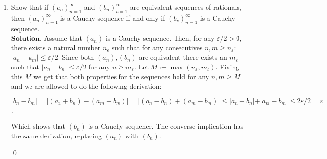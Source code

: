 \documentclass{article}
\theoremstyle{remark}
\begin{document}
\begin{enumerate}
        Let $\varepsilon \leq \min (M, M')$. Then, for some $n_M \geq n_{\varepsilon} \geq 1$, take $n, m \geq n_{\varepsilon}$
        \begin{center}
            $\varepsilon \leq a_n \leq -\varepsilon$
        \end{center}
        But by the inequality given by the fact that $(a_n)$ is a Cauchy sequence we have (adding both inequalities):
        \begin{center}
            $a_m \leq 2a_n \leq a_m$
        \end{center}
        Hence $a_m = 2a_n$, which is then greater than $\varepsilon$.
        Thus:
        \begin{center}
            $\vert a_n - a_m \vert = \vert a_n\vert \geq \varepsilon$.
        \end{center}
        So it shows that $(a_n)$ is not a Cauchy sequence, a contradiction.
        \begin{flushright}
            \qed
        \end{flushright}
        \item Show that if \( (a_n)_{n=1}^{\infty} \) and \( (b_n)_{n=1}^{\infty} \) are 
        equivalent sequences of rationals, then \( (a_n)_{n=1}^{\infty} \) is a Cauchy sequence if and only if \( (b_n)_{n=1}^{\infty} \) is a Cauchy sequence.\\
        $\textbf{Solution.}$
        Assume that $(a_n)$ is a Cauchy sequence.
        Then, for any $\varepsilon/2 > 0$, there exists
        a natural number $n_{\epsilon}$ such that for any consecutives $n,m \geq n_{\varepsilon}$:
        $\vert a_n - a_m \vert \leq \varepsilon/2$. Since both $(a_n), (b_n)$ are equivalent
        there exists an $m_{\varepsilon}$ such that $\vert a_n - b_n \vert \leq \varepsilon/2$ for any
        $n \geq m_{\varepsilon}$.
        Let $M := \max(n_{\varepsilon}, m_{\varepsilon})$. Fixing this $M$ we get that 
        both properties for the sequences hold for any $n,m \geq M$ and
        we are allowed to do the following derivation:
        \begin{center}
            $\vert b_n - b_m\vert = \vert (a_n + b_n) - (a_m + b_m)\vert
            = \vert (a_n - b_n) + (a_m - b_m)\vert \leq \vert a_n - b_n \vert + \vert a_m - b_m\vert
            \leq 2\varepsilon/2 = \varepsilon$.
        \end{center}
        Which shows that $(b_n)$ is a Cauchy sequence.
        The converse implication has the same derivation, replacing $(a_n)$ with $(b_n)$.
        \begin{flushright}
            \qed
        \end{flushright}


\end{enumerate}
\end{document}

